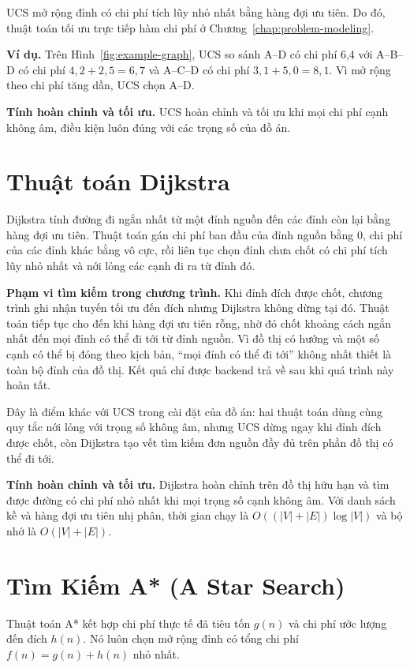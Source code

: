 UCS mở rộng đỉnh có chi phí tích lũy nhỏ nhất bằng hàng đợi ưu tiên. Do đó,
thuật toán tối ưu trực tiếp hàm chi phí ở Chương~\ref{chap:problem-modeling}.

\textbf{Ví dụ.} Trên Hình~\ref{fig:example-graph}, UCS so sánh A--D có chi
phí 6,4 với A--B--D có chi phí $4,2+2,5=6,7$ và A--C--D có chi phí
$3,1+5,0=8,1$. Vì mở rộng theo chi phí tăng dần, UCS chọn A--D.

\textbf{Tính hoàn chỉnh và tối ưu.} UCS hoàn chỉnh và tối ưu khi mọi chi phí
cạnh không âm, điều kiện luôn đúng với các trọng số của đồ án.

\section{Thuật toán Dijkstra}

Dijkstra tính đường đi ngắn nhất từ một đỉnh nguồn đến các đỉnh còn lại bằng
hàng đợi ưu tiên. Thuật toán gán chi phí ban đầu của đỉnh nguồn bằng 0, chi phí
của các đỉnh khác bằng vô cực, rồi liên tục chọn đỉnh chưa chốt có chi phí tích
lũy nhỏ nhất và nới lỏng các cạnh đi ra từ đỉnh đó.

\textbf{Phạm vi tìm kiếm trong chương trình.} Khi đỉnh đích được chốt, chương
trình ghi nhận tuyến tối ưu đến đích nhưng Dijkstra không dừng tại đó. Thuật toán
tiếp tục cho đến khi hàng đợi ưu tiên rỗng, nhờ đó chốt khoảng cách ngắn nhất đến
mọi đỉnh có thể đi tới từ đỉnh nguồn. Vì đồ thị có hướng và một số cạnh có thể bị
đóng theo kịch bản, ``mọi đỉnh có thể đi tới'' không nhất thiết là toàn bộ đỉnh
của đồ thị. Kết quả chỉ được backend trả về sau khi quá trình này hoàn tất.

Đây là điểm khác với UCS trong cài đặt của đồ án: hai thuật toán dùng cùng quy
tắc nới lỏng với trọng số không âm, nhưng UCS dừng ngay khi đỉnh đích được chốt,
còn Dijkstra tạo vết tìm kiếm đơn nguồn đầy đủ trên phần đồ thị có thể đi tới.

\textbf{Tính hoàn chỉnh và tối ưu.} Dijkstra hoàn chỉnh trên đồ thị hữu hạn và
tìm được đường có chi phí nhỏ nhất khi mọi trọng số cạnh không âm. Với danh sách
kề và hàng đợi ưu tiên nhị phân, thời gian chạy là
$O((|V|+|E|)\log |V|)$ và bộ nhớ là $O(|V|+|E|)$.

\section{Tìm Kiếm A* (A Star Search)}

Thuật toán A* kết hợp chi phí thực tế đã tiêu tốn $g(n)$ và chi phí ước lượng đến đích $h(n)$. Nó luôn chọn mở rộng đỉnh có tổng chi phí $f(n) = g(n) + h(n)$ nhỏ nhất.

